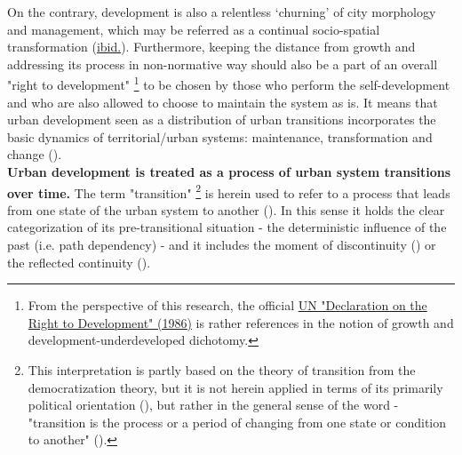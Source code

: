 \documentclass[11pt]{report}
\begin{document}
On the contrary, development is also a relentless ‘churning’ of city morphology and management, which may be referred as a continual socio-spatial transformation (\href{Brenner}{ibid.}).
Furthermore, keeping the distance from growth and addressing its process in non-normative way should also be a part of an overall "right to development"
\footnote{From the perspective of this research, the official \href{UN}{UN "Declaration on the Right to Development" (1986)} is rather references in the notion of growth and development-underdeveloped dichotomy.}
to be chosen by those who perform the self-development and who are also allowed to choose to maintain the system as is.
It means that urban development seen as a distribution of urban transitions incorporates the basic dynamics of territorial/urban systems: maintenance, transformation and change (\href{Friedmann}{\cite{Friedmann1987}}).
\\

\textbf{Urban development is treated as a process of urban system transitions over time.}
The term "transition"
\footnote{This interpretation is partly based on the theory of transition from the democratization theory, but it is not herein applied in terms of its primarily political orientation (\href{Offe}{\cite{Offe1997}}), but rather in the general sense of the word - "transition is the process or a period of changing from one state or condition to another" (\href{Oxford}{\cite{OxfordDictionary?????}}).}
is herein used to refer to a process that leads from one state of the urban system to another
(\href{Stark}{\cite{Stark199}}).
In this sense it holds the clear categorization of its pre-transitional situation - the deterministic influence of the past (i.e. path dependency) - and it includes the moment of discontinuity (\href{Thomas}{\cite{Thomas1998}}) or the reflected continuity (\href{Nedovic}{\cite{NedovicBudic2011}}).
\\
\end{document}
